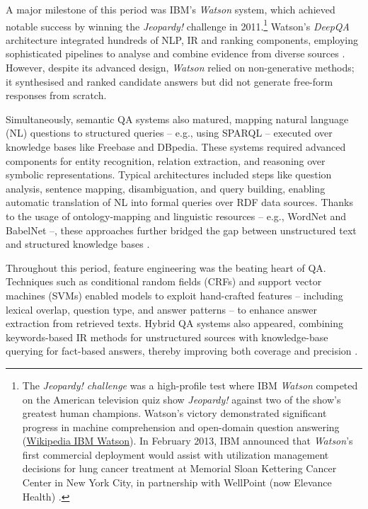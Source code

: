 \begin{spacing}{1.5}
A major milestone of this period was IBM's \textit{Watson} system, which achieved notable success by winning the \textit{Jeopardy!} challenge in 2011.\footnote{The \textit{Jeopardy! challenge} was a high-profile test where IBM \textit{Watson} competed on the American television quiz show \textit{Jeopardy!} against two of the show's greatest human champions. Watson’s victory demonstrated significant progress in machine comprehension and open-domain question answering (\href{https://en.wikipedia.org/w/index.php?title=IBM_Watson&oldid=1301611671}{Wikipedia IBM Watson}). In February 2013, IBM announced that \textit{Watson}'s first commercial deployment would assist with utilization management decisions for lung cancer treatment at Memorial Sloan Kettering Cancer Center in New York City, in partnership with WellPoint (now Elevance Health) \citep{upbin_ibms_2013}.} Watson’s \textit{DeepQA} architecture integrated hundreds of NLP, IR and ranking components, employing sophisticated pipelines to analyse and combine evidence from diverse sources \citep{ferrucci_building_2011}. However, despite its advanced design, \textit{Watson} relied on non-generative methods; it synthesised and ranked candidate answers but did not generate free-form responses from scratch.

Simultaneously, semantic QA systems also matured, mapping natural language (NL) questions to structured queries  -- e.g., using SPARQL -- executed over knowledge bases like Freebase and DBpedia. These systems required advanced components for entity recognition, relation extraction, and reasoning over symbolic representations. Typical architectures included steps like question analysis, sentence mapping, disambiguation, and query building, enabling automatic translation of NL into formal queries over RDF data sources. Thanks to the usage of ontology-mapping and linguistic resources -- e.g., WordNet \citep{miller_wordnet_1992} and BabelNet \citep{navigli_ten_2021} --, these approaches further bridged the gap between unstructured text and structured knowledge bases \citep{franco_ontology-based_2020}.

Throughout this period, feature engineering was the beating heart of QA. Techniques such as conditional random fields (CRFs) and support vector machines (SVMs) enabled models to exploit hand-crafted features -- including lexical overlap, question type, and answer patterns -- to enhance answer extraction from retrieved texts. Hybrid QA systems also appeared, combining keywords-based IR methods for unstructured sources with knowledge-base querying for fact-based answers, thereby improving both coverage and precision \citep{antoniou_survey_2022}.


\end{spacing}
